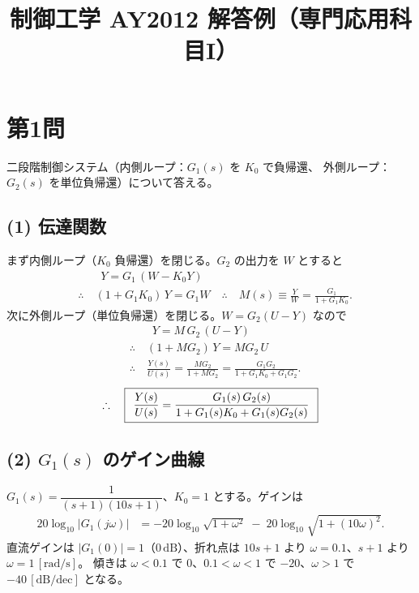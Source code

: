 \documentclass[11pt,a4paper]{article}
\title{制御工学 AY2012 解答例（専門応用科目I）}
\author{}
\date{}
\begin{document}
\maketitle

\section*{第1問}

二段階制御システム（内側ループ：$G_1(s)$ を $K_0$ で負帰還、
外側ループ：$G_2(s)$ を単位負帰還）について答える。

\subsection*{(1) 伝達関数}
まず内側ループ（$K_0$ 負帰還）を閉じる。$G_2$ の出力を $W$ とすると
\begin{align*}
  &\qquad Y = G_1\,(W - K_0 Y)\\
  &\therefore\quad (1+G_1K_0)\,Y = G_1 W
   \quad\therefore\quad M(s)\equiv\frac{Y}{W}=\frac{G_1}{1+G_1K_0}.
\end{align*}
次に外側ループ（単位負帰還）を閉じる。$W=G_2(U-Y)$ なので
\begin{align*}
  &\qquad Y = M\,G_2\,(U-Y)\\
  &\therefore\quad (1+M G_2)\,Y = M G_2\,U\\
  &\therefore\quad \frac{Y(s)}{U(s)}=\frac{M G_2}{1+M G_2}
   =\frac{G_1G_2}{1+G_1K_0+G_1G_2}.
\end{align*}
\[
  \therefore\quad \boxed{\,\;\dfrac{Y(s)}{U(s)}=\dfrac{G_1(s)\,G_2(s)}{1+G_1(s)K_0+G_1(s)G_2(s)}\;\,}
\]

\subsection*{(2) $G_1(s)$ のゲイン曲線}
$G_1(s)=\dfrac{1}{(s+1)(10s+1)}$、$K_0=1$ とする。ゲインは
\begin{align*}
  20\log_{10}|G_1(j\omega)|
  &= -20\log_{10}\sqrt{1+\omega^2}\;-\;20\log_{10}\sqrt{1+(10\omega)^2}.
\end{align*}
直流ゲインは $|G_1(0)|=1$（$0\,\mathrm{dB}$）、折れ点は $10s+1$ より $\omega=0.1$、$s+1$ より $\omega=1\,[\mathrm{rad/s}]$。
傾きは $\omega<0.1$ で $0$、$0.1<\omega<1$ で $-20$、$\omega>1$ で $-40\,[\mathrm{dB/dec}]$ となる。
\end{document}
